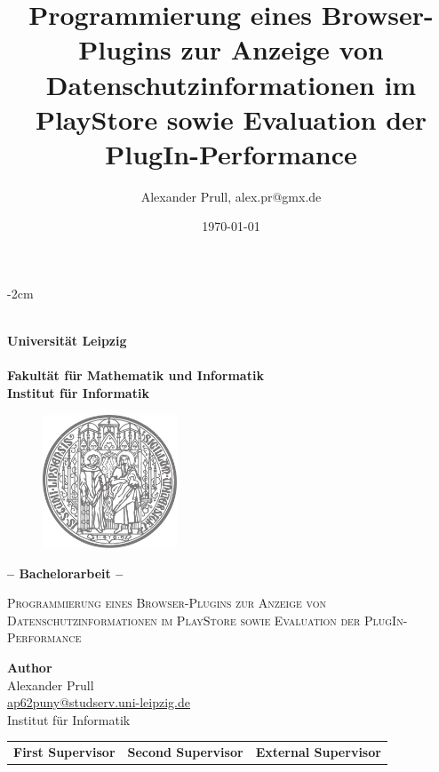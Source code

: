 \documentclass[11pt, a4paper, twoside, openright, final]{book}
\author{Alexander Prull, alex.pr@gmx.de}
\title{Programmierung eines Browser-Plugins zur Anzeige von Datenschutzinformationen im PlayStore sowie Evaluation der PlugIn-Performance}
\date{\today} %
\numberwithin{equation}{chapter}		%
\newcommand{\1}{\mathbbm{1}}
\begin{document}

\begin{titlepage}
	\begin{adjustwidth*}{}{-2cm}
		\begin{center}
			~\\		%
			\textbf{\Huge \sffamily	Universität Leipzig	\\	\small ~					\\
					\large \sffamily	Fakultät für Mathematik und Informatik	 \\
										Institut für Informatik				\\}
			
			\vspace{0.3cm}
			\begin{figure}[H]
	        	\hspace{5.1cm}
	       		\includegraphics[width=4cm]{siegel.png}
	        \end{figure}
	        \vspace{0.15cm}
			\textbf{\Large \sffamily -- Bachelorarbeit --}
			\vspace{0.5cm}
			
			 \textsc{ \LARGE
			Programmierung eines Browser-Plugins zur Anzeige von Datenschutzinformationen im PlayStore sowie Evaluation der PlugIn-Performance}
			
			\vspace{1.0cm}
			\textbf{Author} \\
		Alexander Prull \\ 
		\href{mailto:ap62puny@studserv.uni-leipzig.de}{ap62puny@studserv.uni-leipzig.de} \\
		Institut für Informatik \\
		\end{center}
		
		\vfill
		
		\begin{tabular}{*{3}{C{4cm}}}
			\small \textbf{First Supervisor} & 
			\small \textbf{Second Supervisor} & 
			\small \textbf{External Supervisor} \\
			

\end{tabular}
\end{adjustwidth*}
\end{titlepage}
\end{document}
